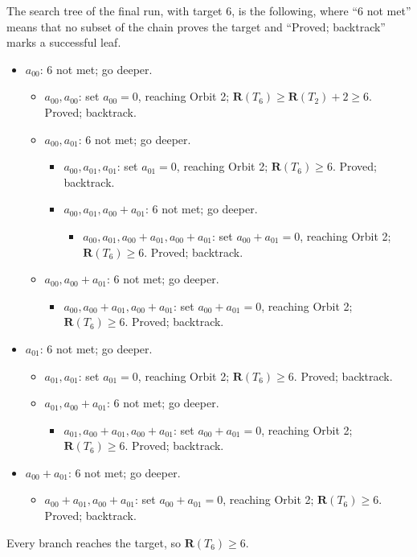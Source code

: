\documentclass[11pt]{article}
\theoremstyle{definition}
\newcommand{\R}{\mathbf{R}}
\begin{document}
The search tree of the final run, with target $6$, is the following, where
``$6$ not met'' means that no subset of the
chain proves the target and ``Proved; backtrack'' marks a successful leaf.
\begin{itemize}
  \item $a_{00}$: $6$ not met; go deeper.
    \begin{itemize}
      \item $a_{00},a_{00}$: set $a_{00}=0$, reaching Orbit 2; $\R(T_6)\ge\R(T_2)+2\ge 6$. Proved; backtrack.
      \item $a_{00},a_{01}$: $6$ not met; go deeper.
        \begin{itemize}
          \item $a_{00},a_{01},a_{01}$: set $a_{01}=0$, reaching Orbit 2; $\R(T_6)\ge 6$. Proved; backtrack.
          \item $a_{00},a_{01},a_{00}+a_{01}$: $6$ not met; go deeper.
            \begin{itemize}
              \item $a_{00},a_{01},a_{00}+a_{01},a_{00}+a_{01}$: set $a_{00}+a_{01}=0$, reaching Orbit 2; $\R(T_6)\ge 6$. Proved; backtrack.
            \end{itemize}
        \end{itemize}
      \item $a_{00},a_{00}+a_{01}$: $6$ not met; go deeper.
        \begin{itemize}
          \item $a_{00},a_{00}+a_{01},a_{00}+a_{01}$: set $a_{00}+a_{01}=0$, reaching Orbit 2; $\R(T_6)\ge 6$. Proved; backtrack.
        \end{itemize}
    \end{itemize}
  \item $a_{01}$: $6$ not met; go deeper.
    \begin{itemize}
      \item $a_{01},a_{01}$: set $a_{01}=0$, reaching Orbit 2; $\R(T_6)\ge 6$. Proved; backtrack.
      \item $a_{01},a_{00}+a_{01}$: $6$ not met; go deeper.
        \begin{itemize}
          \item $a_{01},a_{00}+a_{01},a_{00}+a_{01}$: set $a_{00}+a_{01}=0$, reaching Orbit 2; $\R(T_6)\ge 6$. Proved; backtrack.
        \end{itemize}
    \end{itemize}
  \item $a_{00}+a_{01}$: $6$ not met; go deeper.
    \begin{itemize}
      \item $a_{00}+a_{01},a_{00}+a_{01}$: set $a_{00}+a_{01}=0$, reaching Orbit 2; $\R(T_6)\ge 6$. Proved; backtrack.
    \end{itemize}
\end{itemize}
Every branch reaches the target, so $\R(T_6)\ge 6$.
\end{document}
